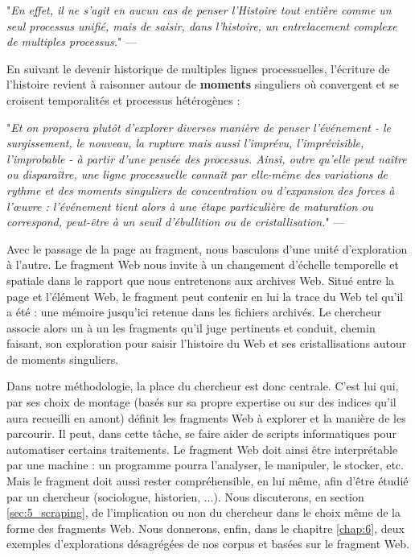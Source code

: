 \documentclass[symmetric,justified,marginals=raggedouter]{tufte-book}
\begin{document}
\begin{fullwidth}
"\textit{En effet, il ne s'agit en aucun cas de penser l'Histoire tout entière comme un seul processus unifié, mais de saisir, dans l'histoire, un entrelacement complexe de multiples processus.}" --- \citep[p.227]{baschet_defaire_2018}\\
\end{fullwidth} 

\noindent En suivant le devenir historique de multiples lignes processuelles, l'écri\-ture de l'histoire revient à raisonner autour de \textbf{moments} singuliers où convergent et se croisent temporalités et processus hétérogènes :\\

\begin{fullwidth}
"\textit{Et on proposera plutôt d'explorer diverses manière de penser l'événement - le surgissement, le nouveau, la rupture mais aussi l'imprévu, l'imprévisible, l'improbable - à partir d'une pensée des processus. Ainsi, outre qu'elle peut naître ou disparaître, une ligne processuelle connaît par elle-même  des variations de rythme et des moments singuliers de concentration ou d'expansion des forces à l'œuvre : l'événement tient alors à une étape particulière de maturation ou correspond, peut-être à un seuil d'ébullition ou de cristallisation.}" --- \citep[p.227-228]{baschet_defaire_2018}\\
\end{fullwidth} 

\noindent Avec le passage de la page au fragment, nous basculons d'une unité d'exploration à l'autre. Le fragment Web nous invite à un changement d'échelle temporelle et spatiale dans le rapport que nous entretenons aux archives Web. Situé entre la page et l'élément Web, le fragment peut contenir en lui la trace du Web tel qu'il a été : une mémoire jusqu'ici retenue dans les fichiers archivés. Le chercheur associe alors un à un les fragments qu'il juge pertinents et conduit, chemin faisant, son exploration pour saisir l'histoire du Web et ses cristallisations autour de moments singuliers. 

Dans notre méthodologie, la place du chercheur est donc centrale. C'est lui qui, par ses choix de montage (basés sur sa propre expertise ou sur des indices qu'il aura recueilli en amont) définit les fragments Web à explorer et la manière de les parcourir. Il peut, dans cette tâche, se faire aider de scripts informatiques pour automatiser certains traitements. Le fragment Web doit ainsi être interprétable par une machine : un programme pourra l'analyser, le manipuler, le stocker, etc. Mais le fragment doit aussi rester compréhensible, en lui même, afin d'être étudié par un chercheur (sociologue, historien, ...). Nous discuterons, en section \ref{sec:5_scraping}, de l'implication ou non du chercheur dans le choix même de la forme des fragments Web. Nous donnerons, enfin, dans le chapitre \ref{chap:6}, deux exemples d'explorations désagrégées de nos corpus et basées sur le fragment Web.
\end{document}

